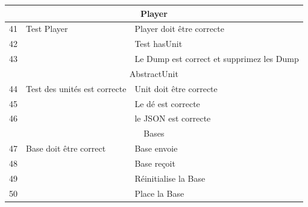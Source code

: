 \begin{center}
\begin{tabular}{|l|l|l|}
        \hline
        \multicolumn{3}{c}{Player}                                                                             \\
        \hline
        41 & Test Player                  & Player doit être correcte                                          \\
        42 &                              & Test hasUnit                                                       \\
        43 &                              & Le Dump est correct et supprimez les Dump                          \\


        \hline
        \multicolumn{3}{c}{AbstractUnit}                                                                       \\
        \hline

        44 & Test des unités est correcte & Unit doit être correcte                                            \\
        45 &                              & Le dé est correcte                                                 \\
        46 &                              & le JSON est correcte                                               \\

        \hline
        \multicolumn{3}{c}{Bases}                                                                              \\
        \hline

        47 & Base doit être correct       & Base envoie                                                        \\
        48 &                              & Base reçoit                                                        \\
        49 &                              & Réinitialise la Base                                               \\
        50 &                              & Place la Base                                                      \\


\end{tabular}
\end{center}
